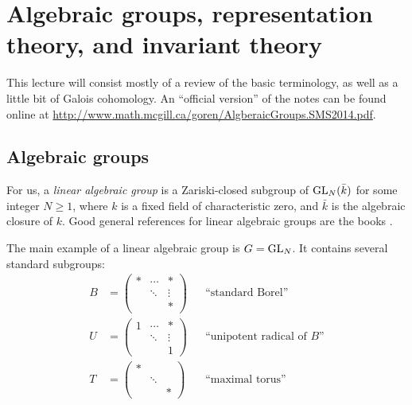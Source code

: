 
\section{Algebraic groups, representation theory, and invariant theory}





This lecture will consist mostly of a review of the basic terminology, as 
well as a little bit of Galois cohomology. An ``official version'' of the 
notes can be found online at 
\url{http://www.math.mcgill.ca/goren/AlgberaicGroups.SMS2014.pdf}. 





\subsection{Algebraic groups}

For us, a \emph{linear algebraic group} is a Zariski-closed subgroup of 
$\operatorname{GL}_N(\bar k)$ for some integer $N\geqslant 1$, where $k$ is a 
fixed field of characteristic zero, and $\bar k$ is the algebraic closure of 
$k$. Good general references for linear algebraic groups are the books 
\cite{b91,gw09,h75,s09}. 

\begin{example}
The main example of a linear algebraic group is $G=\operatorname{GL}_N$. It 
contains several standard subgroups:
\begin{align*}
  B &= \begin{pmatrix} \ast & \cdots & \ast \\ & \ddots & \vdots \\ & & \ast \end{pmatrix} && \text{``standard Borel''} \\
  U &= \begin{pmatrix} 1 & \cdots & \ast \\ & \ddots & \vdots \\ & & 1\end{pmatrix} && \text{``unipotent radical of $B$''} \\
  T &= \begin{pmatrix} \ast \\ & \ddots \\ & & \ast \end{pmatrix} && \text{``maximal torus''}
\end{align*}
\end{example}

